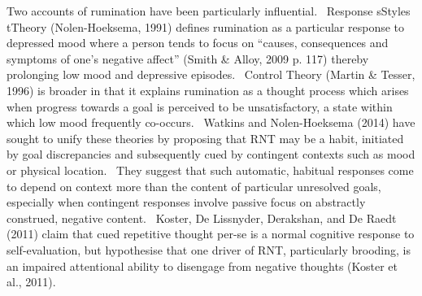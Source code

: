 \documentclass[man,a4paper,biblatex]{apa6}
\begin{document}
Two accounts of rumination have been particularly influential. \ Response sStyles tTheory (Nolen-Hoeksema, 1991) defines rumination as a particular response to depressed mood where a person tends to focus on ``causes, consequences and symptoms of one's negative affect'' (Smith \& Alloy, 2009 p. 117) thereby prolonging low mood and depressive episodes. \ Control Theory (Martin \& Tesser, 1996) is broader in that it explains rumination as a thought process which arises when progress towards a goal is perceived to be unsatisfactory, a state within which low mood frequently co-occurs. \ Watkins and Nolen-Hoeksema (2014) have sought to unify these theories by proposing that RNT may be a habit, initiated by goal discrepancies and subsequently cued by contingent contexts such as mood or physical location. \ They suggest that such automatic, habitual responses come to depend on context more than the content of particular unresolved goals, especially when contingent responses involve passive focus on abstractly construed, negative content. \ Koster, De Lissnyder, Derakshan, and De Raedt (2011) claim that cued repetitive thought per-se is a normal cognitive response to self-evaluation, but hypothesise that one driver of RNT, particularly brooding, is an impaired attentional ability to disengage from negative thoughts (Koster et al., 2011).
\end{document}
